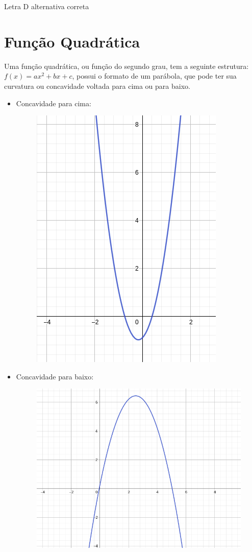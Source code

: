 \begin{multicols*}{2}
    Letra D alternativa correta

    \section*{Função Quadrática}
    Uma função quadrática, ou função do segundo grau, tem a seguinte estrutura: $f(x) = ax^2 + bx 			+c$, possui o formato de um parábola, que pode ter sua curvatura ou concavidade voltada para 			cima ou para baixo.
    \begin{itemize}[wide, labelwidth=!, labelindent=0pt]
        \item Concavidade para cima:
              \begin{figure}[H]
                  \centering
                  \includegraphics[scale=0.3]{assets/rafael/img16.png}
              \end{figure}
        \item Concavidade para baixo:
              \begin{figure}[H]
                  \centering
                  \includegraphics[scale=0.3]{assets/rafael/img17.png}

\end{figure}
\end{itemize}
\end{multicols*}
